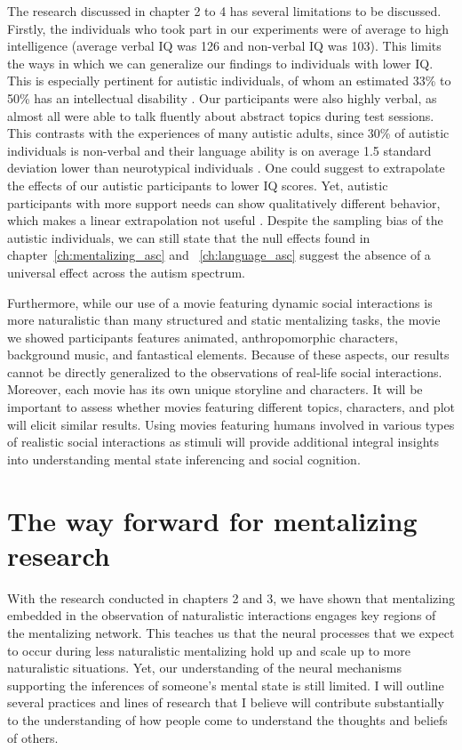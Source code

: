 The research discussed in chapter 2 to 4 has several limitations to be discussed. Firstly, the individuals who took part in our experiments were of average to high intelligence (average verbal IQ was 126 and non-verbal IQ was 103). This limits the ways in which we can generalize our findings to individuals with lower IQ. This is especially pertinent for autistic individuals, of whom an estimated 33\% to 50\% has an intellectual disability \citep{katusic2021,shenouda2023}. Our participants were also highly verbal, as almost all were able to talk fluently about abstract topics during test sessions. This contrasts with the experiences of many autistic adults, since 30\% of autistic individuals is non-verbal and their language ability is on average 1.5 standard deviation lower than neurotypical individuals \citep{kwok2015,anderson2007}. One could suggest to extrapolate the effects of our autistic participants to lower IQ scores. Yet, autistic participants with more support needs can show qualitatively different behavior, which makes a linear extrapolation not useful \citep{wenar1986}. Despite the sampling bias of the autistic individuals, we can still state that the null effects found in chapter~\ref{ch:mentalizing_asc} and ~\ref{ch:language_asc} suggest the absence of a universal effect across the autism spectrum.

Furthermore, while our use of a movie featuring dynamic social interactions is more naturalistic than many structured and static mentalizing tasks, the movie we showed participants features animated, anthropomorphic characters, background music, and fantastical elements. Because of these aspects, our results cannot be directly generalized to the observations of real-life social interactions. Moreover, each movie has its own unique storyline and characters. It will be important to assess whether movies featuring different topics, characters, and plot will elicit similar results. Using movies featuring humans involved in various types of realistic social interactions as stimuli will provide additional integral insights into understanding mental state inferencing and social cognition.

\section{The way forward for mentalizing research}

With the research conducted in chapters 2 and 3, we have shown that mentalizing embedded in the observation of naturalistic interactions engages key regions of the mentalizing network. This teaches us that the neural processes that we expect to occur during less naturalistic mentalizing hold up and scale up to more naturalistic situations. Yet, our understanding of the neural mechanisms supporting the inferences of someone's mental state is still limited. I will outline several practices and lines of research that I believe will contribute substantially to the understanding of how people come to understand the thoughts and beliefs of others.

